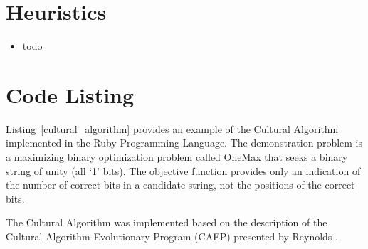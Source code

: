 \documentclass[a4paper, 11pt]{article}
\begin{document}
\section{Heuristics}
\label{sec:heuristics}
\begin{itemize}
	\item todo
\end{itemize}

\section{Code Listing}
\label{sec:code}
Listing~\ref{cultural_algorithm} provides an example of the Cultural Algorithm implemented in the Ruby Programming Language. 
The demonstration problem is a maximizing binary optimization problem called OneMax that seeks a binary string of unity (all `1' bits). The objective function provides only an indication of the number of correct bits in a candidate string, not the positions of the correct bits.

The Cultural Algorithm was implemented based on the description of the Cultural Algorithm Evolutionary Program (CAEP) presented by Reynolds \cite{Reynolds1999}. 


\end{document}

